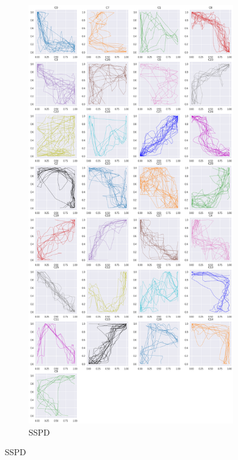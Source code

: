 \begin{figure}[h]
    \begin{subfigure}[c]{0.3\linewidth}
     \includegraphics[width=\linewidth]{figs/clusters/CLU_AP_ALL[SSPD].png}
    \caption{SSPD}
  \end{subfigure}

\end{figure}

